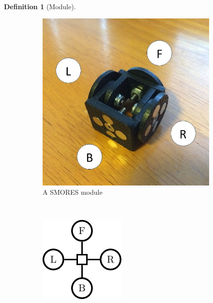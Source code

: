 \documentclass[conference]{IEEEtran}
\theoremstyle{definition}
\newtheorem{definition}{Definition}[section]
\begin{document}
\begin{definition}[Module]
\begin{figure}
\begin{center}
	\begin{subfigure}[b]{0.4\columnwidth}
		\includegraphics[width=\textwidth]{images/smores.JPG}
		\caption{A SMORES module}
		\label{fig:smores_photo}
           \end{subfigure}
           ~
	\begin{subfigure}[b]{0.4\columnwidth}
           	\includegraphics[width=\textwidth]{images/tikz/smores.pdf}

\end{subfigure}
\end{center}
\end{figure}
\end{definition}
\end{document}
